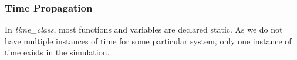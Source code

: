 

	


	\subsubsection{Time Propagation}
	In \emph{time\_class}, most functions and variables are declared static. 
	As we do not have multiple instances of time for some particular system, only one instance of time exists in the simulation.
	
